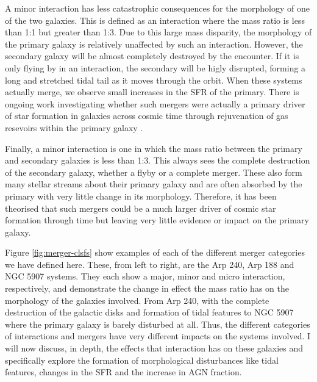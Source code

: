 A minor interaction has less catastrophic consequences for the morphology of one of the two galaxies. This is defined as an interaction where the mass ratio is less than 1:1 but greater than 1:3. Due to this large mass disparity, the morphology of the primary galaxy is relatively unaffected by such an interaction. However, the secondary galaxy will be almost completely destroyed by the encounter. If it is only flying by in an interaction, the secondary will be higly disrupted, forming a long and stretched tidal tail as it moves through the orbit. When these systems actually merge, we observe small increases in the SFR of the primary. There is ongoing work investigating whether such mergers were actually a primary driver of star formation in galaxies across cosmic time through rejuvenation of gas resevoirs within the primary galaxy \citep{2007A&A...476.1179B, 2014MNRAS.440.2944K, 2022MNRAS.511..607J}.

Finally, a minor interaction is one in which the mass ratio between the primary and secondary galaxies is less than 1:3. This always sees the complete destruction of the secondary galaxy, whether a flyby or a complete merger. These also form many stellar streams about their primary galaxy and are often absorbed by the primary with very little change in its morphology. Therefore, it has been theorised that such mergers could be a much larger driver of cosmic star formation through time but leaving very little evidence or impact on the primary galaxy. 

Figure \ref{fig:merger-clsfs} show examples of each of the different merger categories we have defined here. These, from left to right, are the Arp 240, Arp 188 and NGC 5907 systems. They each show a major, minor and micro interaction, respectively, and demonstrate the change in effect the mass ratio has on the morphology of the galaxies involved. From Arp 240, with the complete destruction of the galactic disks and formation of tidal features to NGC 5907 where the primary galaxy is barely disturbed at all. Thus, the different categories of interactions and mergers have very different impacts on the systems involved. I will now discuss, in depth, the effects that interaction has on these galaxies and specifically explore the formation of morphological disturbances like tidal features, changes in the SFR and the increase in AGN fraction.

